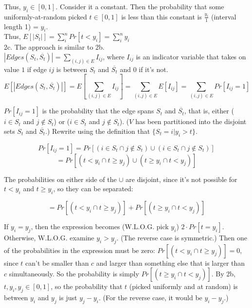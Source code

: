 Thus, $y_i \in [0, 1]$. Consider it a constant. Then the probability that some uniformly-at-random picked $t \in [0, 1]$ is less than this constant is $\frac{y_i}{1}$ (interval length 1) = $y_i$. \\

Thus, $E[|S_t|] = \sum_i^n Pr[t < y_i] = \sum_i^n y_i$\\

2c. The approach is similar to 2b. \\

$|Edges(S_t, \overline{S_t})| = \sum_{(i, j) \in E} I_{ij}$, where $I_{ij}$ is an indicator variable that takes on value $1$ if edge $ij$ is between $S_t$ and $\overline{S_t}$ and $0$ if it's not.\\

$$E[|Edges(S_t, \overline{S_t})|] = E[\sum_{(i, j) \in E} I_{ij}] = \sum_{(i, j) \in E} E[I_{ij}] = \sum_{(i, j) \in E} Pr[I_{ij} = 1]$$

$Pr[I_{ij} = 1]$ is the probability that the edge spans $S_t$ and $\overline{S_t}$, that is, either ($i \in S_t$ and $j \not\in S_t$) or ($i \in S_t$ and $j \not\in S_t$). ($V$ has been partitioned into the disjoint sets $S_t$ and $\overline{S_t}$.) Rewrite using the definition that $\{S_t = i | y_i > t \}$.

$$Pr[I_{ij} = 1] = Pr[ (i \in S_t \cap j \not\in S_t) \cup (i \in S_t \cap j \not\in S_t)]$$
$$= Pr[ (t < y_i \cap t \geq y_j) \cup (t \geq y_i \cap t < y_j)] $$

The probabilities on either side of the $\cup$ are disjoint, since it's not possible for $t < y_i$ and $ t \geq y_i$, so they can be separated:

$$= Pr[ (t < y_i \cap t \geq y_j)] + Pr [(t \geq y_i \cap t < y_j)] $$

If $y_i = y_j$, then the expression becomes (W.L.O.G. pick $y_i$) $2 \cdot Pr[t = y_i]$.\\

Otherwise, W.L.O.G. examine $y_i > y_j$. (The reverse case is symmetric.) Then one of the probabilities in the expression must be zero: $Pr[ (t < y_i \cap t \geq y_j)] = 0$, since $t$ can't be smaller than $c$ and larger than something else that is larger than $c$ simultaneously. So the probability is simply $Pr [(t \geq y_i \cap t < y_j)]$. By 2b, $t, y_i, y_j \in [0, 1]$, so the probability that $t$ (picked uniformly and at random) is between $y_i$ and $y_j$ is just $y_j - y_i$. (For the reverse case, it would be $y_i - y_j$.)\\

